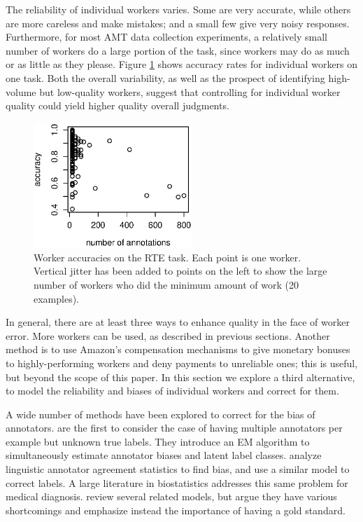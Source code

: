 \documentclass[11pt]{article}
\begin{document}
The reliability of individual workers varies.  Some are very accurate, while others are more careless and make mistakes; and a small few give very noisy responses.  Furthermore, for most AMT data collection experiments, a relatively small number of workers do a large portion of the task, since workers may do as much or as little as they please.  Figure \ref{Workers} shows accuracy rates for individual workers on one task.  Both the overall variability, as well as the prospect of identifying high-volume but low-quality workers, suggest that controlling for individual worker quality could yield higher quality overall judgments.

\begin{figure}[t]
\centering
\includegraphics[width=6cm]{figures/workers.eps}
\caption{Worker accuracies on the RTE task.  Each point is one worker.  Vertical jitter has been added to points on the left to show the large number of workers who did the minimum amount of work (20 examples).} \label{Workers}
\end{figure}
In general, there are at least three ways to enhance quality in the face of worker error.  More workers can be used, as described in previous sections.  
Another method is to use Amazon's compensation mechanisms to give monetary bonuses to highly-performing workers and deny payments to unreliable ones; this is useful, but beyond the scope of this paper.  In this section we explore a third alternative, to model the reliability and biases of individual workers and correct for them.

A wide number of methods have been explored to correct for the bias of annotators.   are the first to consider the case of having multiple annotators per example but unknown true labels.  They introduce an EM algorithm to simultaneously estimate annotator biases and latent label classes.   analyze linguistic annotator agreement statistics to find bias, and use a similar model to correct labels.  A large literature in biostatistics addresses this same problem for medical diagnosis.   review several related models, but argue they have various shortcomings and emphasize instead the importance of having a gold standard.
\end{document}
